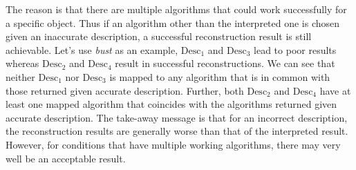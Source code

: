 The reason is that there are multiple algorithms that could work successfully for a specific object. Thus if an algorithm other than the interpreted one is chosen given an inaccurate description, a successful reconstruction result is still achievable. Let's use \textit{bust} as an example, $\text{Desc}_1$ and $\text{Desc}_3$ lead to poor results whereas $\text{Desc}_2$ and $\text{Desc}_4$ result in successful reconstructions. We can see that neither $\text{Desc}_1$ nor $\text{Desc}_3$ is mapped to any algorithm that is in common with those returned given accurate description. Further, both $\text{Desc}_2$ and $\text{Desc}_4$ have at least one mapped algorithm that coincides with the algorithms returned given accurate description. The take-away message is that for an incorrect description, the reconstruction results are generally worse than that of the interpreted result. However, for conditions that have multiple working algorithms, there may very well be an acceptable result.

